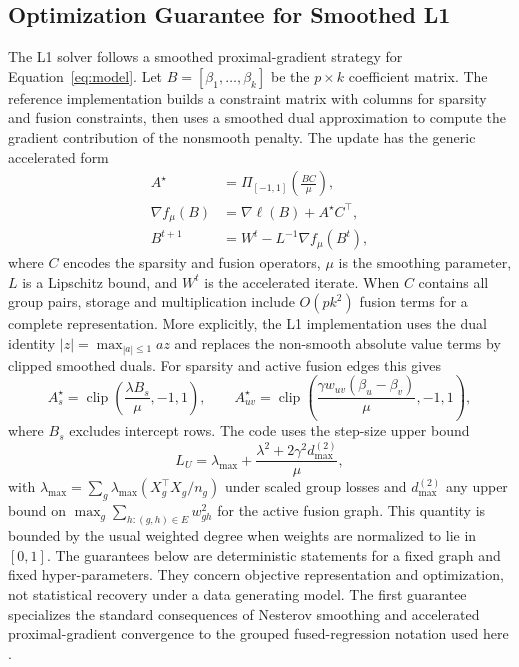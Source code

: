 \documentclass[twoside,11pt]{article}
\DeclareMathOperator{\clip}{clip}
\begin{document}
\subsection{Optimization Guarantee for Smoothed L1}
The L1 solver follows a smoothed proximal-gradient strategy for Equation~\ref{eq:model}. 
Let $B=[\beta_1,\ldots,\beta_k]$ be the $p \times k$ coefficient matrix. 
The reference implementation builds a constraint matrix with columns for sparsity and fusion constraints, then uses a smoothed dual approximation to compute the gradient contribution of the nonsmooth penalty.
The update has the generic accelerated form
\begin{align}
  A^\star &= \Pi_{[-1,1]}\left(\frac{B C}{\mu}\right),\\
  \nabla f_\mu(B) &= \nabla \ell(B) + A^\star C^\top,\\
  B^{t+1} &= W^t - L^{-1}\nabla f_\mu(B^t),
\end{align}
where $C$ encodes the sparsity and fusion operators, $\mu$ is the smoothing parameter, $L$ is a Lipschitz bound, and $W^t$ is the accelerated iterate.
When $C$ contains all group pairs, storage and multiplication include $O(pk^2)$ fusion terms for a complete representation.
More explicitly, the L1 implementation uses the dual identity $|z|=\max_{|a|\leq 1} az$ and replaces the non-smooth absolute value terms by clipped smoothed duals. 
For sparsity and active fusion edges this gives
\[
  A_s^\star = \clip\left(\frac{\lambda B_s}{\mu}, -1, 1\right),
  \qquad
  A_{uv}^\star =
  \clip\left(\frac{\gamma w_{uv}(\beta_u-\beta_v)}{\mu}, -1, 1\right),
\]
where $B_s$ excludes intercept rows. The code uses the step-size upper bound
\[
  L_U =
  \lambda_{\max}
  + \frac{\lambda^2+2\gamma^2 d_{\max}^{(2)}}{\mu},
\]
with $\lambda_{\max}=\sum_g \lambda_{\max}(X_g^\top X_g/n_g)$ under scaled group losses and $d_{\max}^{(2)}$ any upper bound on
$\max_g\sum_{h:(g,h)\in E} w_{gh}^2$ for the active fusion graph. 
This quantity is bounded by the usual weighted degree when weights are normalized to lie in $[0,1]$.
The guarantees below are deterministic statements for a fixed graph and fixed hyper-parameters. 
They concern objective representation and optimization, not statistical recovery under a data generating model.
The first guarantee specializes the standard consequences of Nesterov smoothing and accelerated proximal-gradient convergence to the grouped fused-regression notation used here \citep{nesterov2005smooth,beck2009fast}.
\end{document}
